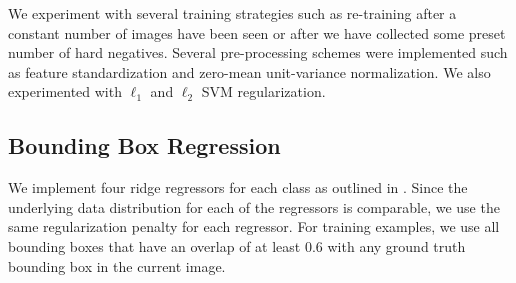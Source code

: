 \documentclass[10pt,twocolumn,letterpaper]{article}
\begin{document}

We experiment with several training strategies such as re-training after a constant number of images have been seen or after we have collected some preset number of hard negatives. Several pre-processing schemes were implemented such as feature standardization and zero-mean unit-variance normalization. We also experimented with $\ell_1$ and $\ell_2$ SVM regularization.


\subsection{Bounding Box Regression}

We implement four ridge regressors for each class as outlined in \cite{girshick2014rich}. Since the underlying data distribution for each of the regressors is comparable, we use the same regularization penalty for each regressor. For training examples, we use all bounding boxes that have an overlap of at least $0.6$ with any ground truth bounding box in the current image.
\end{document}

